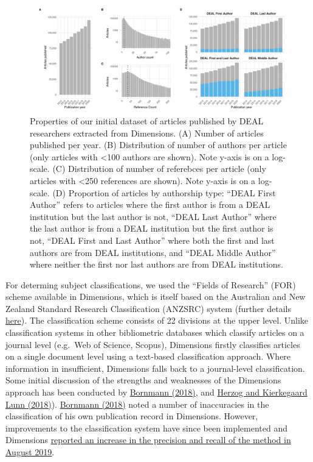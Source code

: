 \documentclass[
]{article}
\begin{document}
\begin{figure}
\centering
\includegraphics{analysis_files/figure-latex/items-overview-1.pdf}
\caption{\label{fig:items-overview}Properties of our initial dataset of articles published by DEAL researchers extracted from Dimensions. (A) Number of articles published per year. (B) Distribution of number of authors per article (only articles with \textless100 authors are shown). Note y-axis is on a log-scale. (C) Distribution of number of referebces per article (only articles with \textless250 references are shown). Note y-axis is on a log-scale. (D) Proportion of articles by authorship type: ``DEAL First Author'' refers to articles where the first author is from a DEAL institution but the last author is not, ``DEAL Last Author'' where the last author is from a DEAL institution but the first author is not, ``DEAL First and Last Author'' where both the first and last authors are from DEAL institutions, and ``DEAL Middle Author'' where neither the first nor last authors are from DEAL institutions.}
\end{figure}

For determing subject classifications, we used the ``Fields of Research'' (FOR) scheme available in Dimensions, which is itself based on the Australian and New Zealand Standard Research Classification (ANZSRC) system (further details \href{https://dimensions.freshdesk.com/support/solutions/articles/23000018826-what-is-the-background-behind-the-fields-of-research-for-classification-system-}{here}). The classification scheme consists of 22 divisions at the upper level. Unlike classification systems in other bibliometric databases which classify articles on a journal level (e.g.~Web of Science, Scopus), Dimensions firstly classifies articles on a single document level using a text-based classification approach. Where information in insufficient, Dimensions falls back to a journal-level classification. Some initial discussion of the strengths and weaknesses of the Dimensions approach has been conducted by \href{https://doi.org/10.1007/s11192-018-2855-y}{Bornmann (2018)}, and \href{https://doi.org/10.1007/s11192-018-2854-z}{Herzog and Kierkegaard Lunn (2018)}). \href{https://doi.org/10.1007/s11192-018-2855-y}{Bornmann (2018)} noted a number of inaccuracies in the classification of his own publication record in Dimensions. However, improvements to the classification system have since been implemented and Dimensions \href{https://www.dimensions.ai/release-notes/}{reported an increase in the precision and recall of the method in August 2019}.
\end{document}
